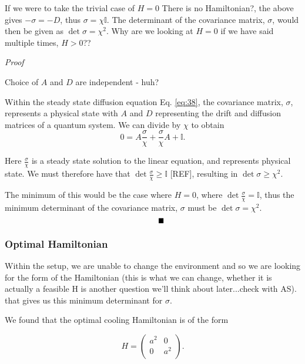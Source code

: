 \documentclass[11pt,a4paper]{article}
\numberwithin{equation}{section}
\begin{document}
	If we were to take the trivial case of $H=0$ \color{red}There is no Hamiltonian?\color{black}, the above gives $-\sigma = -D$, thus $\sigma = \chi \mathbb{I}$. The determinant of the covariance matrix, $\sigma$, would then be given as $\det\sigma = \chi^{2}$. \color{red}Why are we looking at $H=0$ if we have said multiple times, $H>0$??\color{black}
	
	\color{blue}\emph{Proof}
	
	Choice of $A$ and $D$ are independent - huh? 
	
	Within the steady state diffusion equation Eq. \ref{eq:38}, the covariance matrix, $\sigma$, represents a physical state with $A$ and $D$ representing the drift and diffusion matrices of a quantum system. We can divide by $\chi$ to obtain
	\begin{equation*}
	0 = A \frac{\sigma}{\chi} + \frac{\sigma}{\chi} A + \mathbb{I}.
	\end{equation*}
	
	Here $\frac{\sigma}{\chi}$ is a steady state solution to the linear equation, and represents physical state. We must therefore have that $\det\frac{\sigma}{\chi} \geq \mathbb{I}$ [REF], resulting in $\det \sigma \geq \chi^2$. 
	
	The minimum of this would be the case where $H=0$, where $\det\frac{\sigma}{\chi} = \mathbb{I}$, thus the minimum determinant of the covariance matrix, $\sigma$ must be $\det \sigma = \chi^2$.
	\begin{equation*}
	\tag*{\rule{2mm}{2mm}}
	\end{equation*}\color{black}
	
	\subsubsection{Optimal Hamiltonian}
	Within the setup, we are unable to change the environment and so we are looking for the form of the Hamiltonian \color{blue}(this is what we can change, whether it is actually a feasible H is another question we'll think about later...check with AS).\color{black} that gives us this minimum determinant for $\sigma$.
	
	We found that the optimal cooling Hamiltonian is of the form 
	
	\begin{equation*}
	H =  \begin{pmatrix}
	a^2 & 0  \\
	0 & a^2\\
	\end{pmatrix}.
	\end{equation*}
\end{document}
